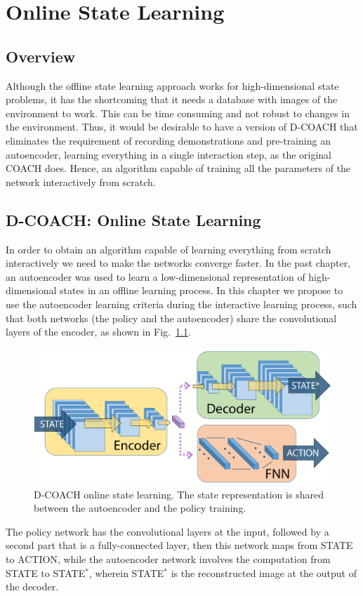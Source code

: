 \chapter{Online State Learning}
\section{Overview}

Although the offline state learning approach works for high-dimensional state problems, it has the shortcoming that it needs a database with images of the environment to work. This can be time consuming and not robust to changes in the environment. Thus, it would be desirable to have a version of D-COACH that eliminates the requirement of recording demonstrations and pre-training an autoencoder, learning everything in a single interaction step, as the original COACH does. Hence, an algorithm capable of training all the parameters of the network interactively from scratch. 

\section{D-COACH: Online State Learning}
In order to obtain an algorithm capable of learning everything from scratch interactively we need to make the networks converge faster. In the past chapter, an autoencoder was used to learn a low-dimensional representation of high-dimensional states in an offline learning process. In this chapter we propose to use the autoencoder learning criteria during the interactive learning process, such that both networks (the policy and the autoencoder) share the convolutional layers of the encoder, as shown in Fig.~\ref{fig:msim}.

\begin{figure}[H]
    \centering
    \includegraphics[width=0.6\linewidth]{imagenes/cap2/m2.pdf}
    \caption{D-COACH online state learning. The state representation is shared between the autoencoder and the policy training.}
    \label{fig:msim}
\end{figure}

The policy network has the convolutional layers at the input, followed by a second part that is a fully-connected layer, then this network maps from STATE to ACTION, while the autoencoder network involves the computation from STATE to STATE$^{*}$, wherein  STATE$^{*}$ is the reconstructed image at the output of the decoder.

